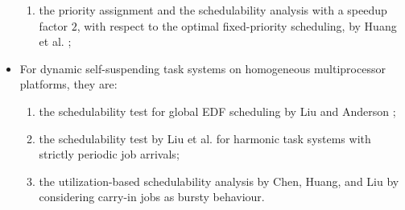 \begin{itemize}
\begin{enumerate}
  \item the priority assignment and the schedulability analysis with a
    speedup factor $2$, with respect to the optimal fixed-priority
    scheduling, by Huang et
    al. \cite{huangpass:dac2015};
  \end{enumerate}
\item For dynamic self-suspending task systems on homogeneous multiprocessor
  platforms, they are:
  \begin{enumerate}
  \item the schedulability test for global EDF scheduling by Liu and
    Anderson \cite{DBLP:conf/ecrts/LiuA13};
  \item the schedulability test by Liu et
    al. \cite{DBLP:conf/ecrts/LiuCH014} for harmonic task
    systems with strictly periodic job arrivals;
  \item the utilization-based schedulability analysis by Chen, Huang,
    and Liu \cite{ChenHLRTSS2015} by considering carry-in jobs as
    bursty behaviour.
  \end{enumerate}
\end{itemize}





